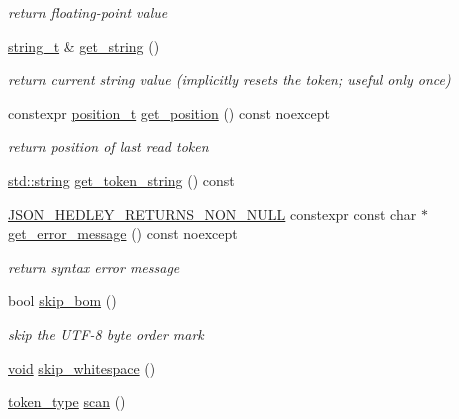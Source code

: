 \begin{DoxyCompactItemize}
\begin{DoxyCompactList}\small\item\em return floating-\/point value \end{DoxyCompactList}\item 
\hyperlink{classnlohmann_1_1detail_1_1lexer_af85c01fd669d529ab93a9e1d80b62015}{string\+\_\+t} \& \hyperlink{classnlohmann_1_1detail_1_1lexer_a76875bb49a480763f6c48b8586f7e60e}{get\+\_\+string} ()
\begin{DoxyCompactList}\small\item\em return current string value (implicitly resets the token; useful only once) \end{DoxyCompactList}\item 
constexpr \hyperlink{structnlohmann_1_1detail_1_1position__t}{position\+\_\+t} \hyperlink{classnlohmann_1_1detail_1_1lexer_a948c80b8bd8a3095b544e4655e1ca37e}{get\+\_\+position} () const noexcept
\begin{DoxyCompactList}\small\item\em return position of last read token \end{DoxyCompactList}\item 
\hyperlink{namespacenlohmann_1_1detail_a1ed8fc6239da25abcaf681d30ace4985ab45cffe084dd3d20d928bee85e7b0f21}{std\+::string} \hyperlink{classnlohmann_1_1detail_1_1lexer_a1d3814497f0f46daa42804d432647b09}{get\+\_\+token\+\_\+string} () const 
\item 
\hyperlink{json_8hpp_a5f2aaec3b681d0a72f7d6e90b70cdcd1}{J\+S\+O\+N\+\_\+\+H\+E\+D\+L\+E\+Y\+\_\+\+R\+E\+T\+U\+R\+N\+S\+\_\+\+N\+O\+N\+\_\+\+N\+U\+LL} constexpr const char $\ast$ \hyperlink{classnlohmann_1_1detail_1_1lexer_a9da0c649f03e8b3f730501d26c876a78}{get\+\_\+error\+\_\+message} () const noexcept
\begin{DoxyCompactList}\small\item\em return syntax error message \end{DoxyCompactList}\item 
bool \hyperlink{classnlohmann_1_1detail_1_1lexer_a7cd7d55de2cd398660bc243c7229caf9}{skip\+\_\+bom} ()
\begin{DoxyCompactList}\small\item\em skip the U\+T\+F-\/8 byte order mark \end{DoxyCompactList}\item 
\hyperlink{namespacenlohmann_1_1detail_a59fca69799f6b9e366710cb9043aa77d}{void} \hyperlink{classnlohmann_1_1detail_1_1lexer_a449f3f3703dfbf8b757e12f002668604}{skip\+\_\+whitespace} ()
\item 
\hyperlink{classnlohmann_1_1detail_1_1lexer__base_aa3538cce439a2de6c7893e627b38c454}{token\+\_\+type} \hyperlink{classnlohmann_1_1detail_1_1lexer_a40320a8fef5f1f03b60c8b2f2f40af4d}{scan} ()
\end{DoxyCompactItemize}
